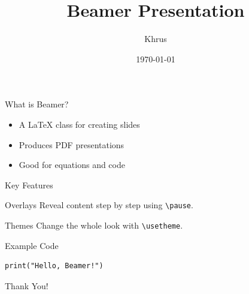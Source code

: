 \documentclass{beamer}
\title{Beamer Presentation}
\author{Khrus}
\institute{MNIT Jaipur}
\date{\today}
\begin{document}
\begin{frame}
  \titlepage
\end{frame}

\begin{frame}{What is Beamer?}
  \begin{itemize}
    \item A LaTeX class for creating slides
    \item Produces PDF presentations
    \item Good for equations and code
  \end{itemize}
\end{frame}

\begin{frame}{Key Features}
  \begin{block}{Overlays}
    Reveal content step by step using \texttt{\textbackslash pause}.
  \end{block}
  \pause
  \begin{alertblock}{Themes}
    Change the whole look with \texttt{\textbackslash usetheme}.
  \end{alertblock}
\end{frame}

\begin{frame}[fragile]{Example Code}
\begin{verbatim}
print("Hello, Beamer!")
\end{verbatim}
\end{frame}

\begin{frame}
  \centering \Large Thank You!
\end{frame}
\end{document}
